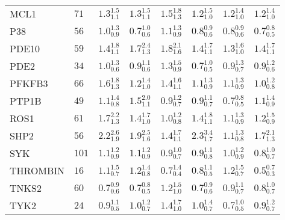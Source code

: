 \begin{tabular}{llllllll}
MCL1        &    $71$ &  $1.3_{1.1}^{1.5}$ &  $1.3_{1.1}^{1.5}$ &  $1.5_{1.3}^{1.8}$ &  $1.2_{1.0}^{1.5}$ &  $1.2_{1.0}^{1.4}$ &  $1.2_{1.0}^{1.4}$ \\
P38         &    $56$ &  $1.0_{0.9}^{1.3}$ &  $0.7_{0.6}^{1.0}$ &  $1.1_{0.9}^{1.3}$ &  $0.8_{0.6}^{0.9}$ &  $0.8_{0.6}^{0.9}$ &  $0.7_{0.5}^{0.8}$ \\
PDE10       &    $59$ &  $1.4_{1.1}^{1.8}$ &  $1.7_{1.3}^{2.4}$ &  $1.8_{1.6}^{2.1}$ &  $1.4_{1.1}^{1.7}$ &  $1.3_{1.0}^{1.6}$ &  $1.4_{1.1}^{1.7}$ \\
PDE2        &    $34$ &  $1.0_{0.6}^{1.3}$ &  $0.9_{0.6}^{1.1}$ &  $1.3_{0.9}^{1.5}$ &  $0.7_{0.5}^{1.0}$ &  $0.9_{0.7}^{1.3}$ &  $0.9_{0.6}^{1.2}$ \\
PFKFB3      &    $66$ &  $1.6_{1.3}^{1.8}$ &  $1.2_{1.0}^{1.4}$ &  $1.4_{1.1}^{1.6}$ &  $1.1_{0.9}^{1.3}$ &  $1.1_{0.9}^{1.3}$ &  $1.0_{0.8}^{1.2}$ \\
PTP1B       &    $49$ &  $1.1_{0.8}^{1.4}$ &  $1.5_{1.1}^{2.0}$ &  $0.9_{0.7}^{1.2}$ &  $0.9_{0.7}^{1.1}$ &  $0.7_{0.5}^{0.8}$ &  $1.1_{0.9}^{1.4}$ \\
ROS1        &    $61$ &  $1.7_{1.3}^{2.2}$ &  $1.4_{1.0}^{1.7}$ &  $1.0_{0.8}^{1.2}$ &  $1.4_{1.1}^{1.8}$ &  $1.1_{0.9}^{1.3}$ &  $1.2_{0.9}^{1.5}$ \\
SHP2        &    $56$ &  $2.2_{1.9}^{2.6}$ &  $1.9_{1.6}^{2.5}$ &  $1.4_{1.1}^{1.7}$ &  $2.3_{1.7}^{3.4}$ &  $1.1_{0.8}^{1.3}$ &  $1.7_{1.3}^{2.1}$ \\
SYK         &   $101$ &  $1.1_{0.9}^{1.2}$ &  $1.1_{0.9}^{1.2}$ &  $0.9_{0.7}^{1.0}$ &  $0.9_{0.8}^{1.1}$ &  $1.0_{0.9}^{1.2}$ &  $0.8_{0.7}^{1.0}$ \\
THROMBIN    &    $16$ &  $1.1_{0.7}^{1.5}$ &  $1.2_{0.8}^{1.4}$ &  $0.7_{0.4}^{1.4}$ &  $0.8_{0.5}^{1.1}$ &  $1.2_{0.7}^{1.5}$ &  $0.5_{0.3}^{0.7}$ \\
TNKS2       &    $60$ &  $0.7_{0.6}^{0.9}$ &  $0.7_{0.5}^{0.8}$ &  $1.2_{1.0}^{1.5}$ &  $0.7_{0.6}^{0.9}$ &  $0.9_{0.7}^{1.1}$ &  $0.8_{0.7}^{1.0}$ \\
TYK2        &    $24$ &  $0.9_{0.5}^{1.1}$ &  $1.0_{0.7}^{1.2}$ &  $1.4_{1.0}^{1.7}$ &  $1.0_{0.7}^{1.4}$ &  $0.7_{0.5}^{1.0}$ &  $0.9_{0.7}^{1.2}$ \\
\bottomrule
\end{tabular}
